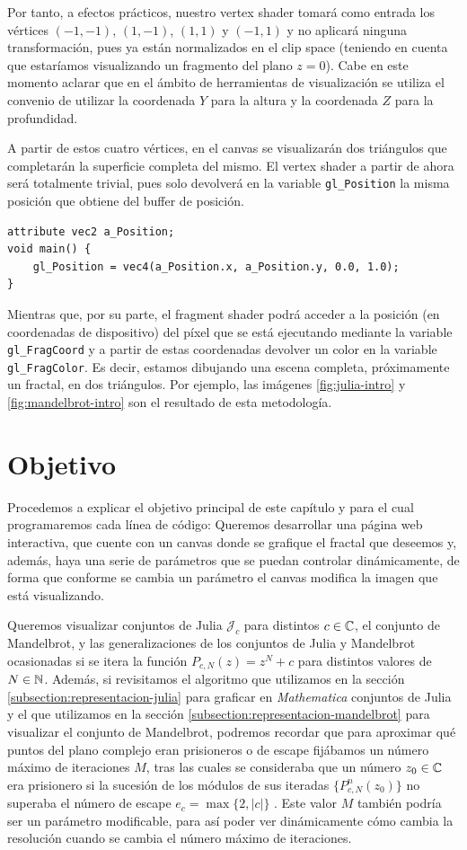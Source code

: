 Por tanto, a efectos prácticos, nuestro vertex shader tomará como entrada los vértices $(-1,-1)$, $(1,-1)$, $(1,1)$ y $(-1,1)$ y no aplicará ninguna transformación, pues ya están normalizados en el clip space (teniendo en cuenta que estaríamos visualizando un fragmento del plano $z=0$). Cabe en este momento aclarar que en el ámbito de herramientas de visualización se utiliza el convenio de utilizar la coordenada $Y$ para la altura y la coordenada $Z$ para la profundidad. 

A partir de estos cuatro vértices, en el canvas se visualizarán dos triángulos que completarán la superficie completa del mismo. El vertex shader a partir de ahora será totalmente trivial, pues solo devolverá en la variable \verb|gl_Position| la misma posición que obtiene del buffer de posición.

\begin{lstlisting}
attribute vec2 a_Position;
void main() {
    gl_Position = vec4(a_Position.x, a_Position.y, 0.0, 1.0);
}
\end{lstlisting}

Mientras que, por su parte, el fragment shader podrá acceder a la posición (en coordenadas de dispositivo) del píxel que se está ejecutando mediante la variable \verb|gl_FragCoord| y a partir de estas coordenadas devolver un color en la variable \verb|gl_FragColor|. Es decir, estamos dibujando una escena completa, próximamente un fractal, en dos triángulos. Por ejemplo, las imágenes \ref{fig:julia-intro} y \ref{fig:mandelbrot-intro} son el resultado de esta metodología. 

\section{Objetivo}

Procedemos a explicar el objetivo principal de este capítulo y para el cual programaremos cada línea de código: Queremos desarrollar una página web interactiva, que cuente con un canvas donde se grafique el fractal que deseemos y, además, haya una serie de parámetros que se puedan controlar dinámicamente, de forma que conforme se cambia un parámetro el canvas modifica la imagen que está visualizando.

Queremos visualizar conjuntos de Julia $\mathcal{J}_c$ para distintos $c\in\mathbb{C}$, el conjunto de Mandelbrot, y las generalizaciones de los conjuntos de Julia y Mandelbrot ocasionadas si se itera la función $P_{c,N}(z)=z^N+c$ para distintos valores de $N\in\mathbb{N}$. Además, si revisitamos el algoritmo que utilizamos en la sección \ref{subsection:representacion-julia} para graficar en \textit{Mathematica} conjuntos de Julia y el que utilizamos en la sección \ref{subsection:representacion-mandelbrot} para visualizar el conjunto de Mandelbrot, podremos recordar que para aproximar qué puntos del plano complejo eran prisioneros o de escape fijábamos un número máximo de iteraciones $M$, tras las cuales se consideraba que un número $z_0\in\mathbb{C}$ era prisionero si la sucesión de los módulos de sus iteradas $\{P_{c,N}^n(z_0)\}$ no superaba el número de escape $e_c=\max\{2,|c|\}$ . Este valor $M$ también podría ser un parámetro modificable, para así poder ver dinámicamente cómo cambia la resolución cuando se cambia el número máximo de iteraciones.

